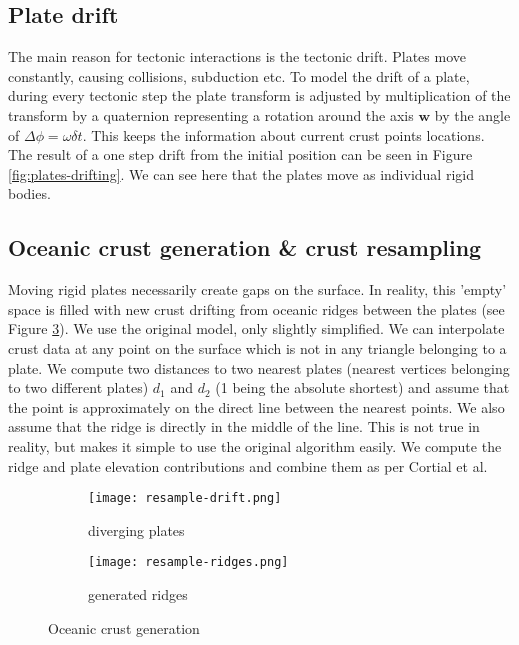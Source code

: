 \subsection{Plate drift}
The main reason for tectonic interactions is the tectonic drift. Plates move constantly, causing collisions, subduction etc. To model the drift of a plate, during every tectonic step the plate transform is adjusted
by multiplication of the transform by a quaternion representing a rotation around the axis $\mathbf{w}$ by the angle of $\Delta\phi=\omega\delta t$. This keeps the information about current crust points locations. The result of a one step drift from the initial position can be seen in Figure \ref{fig:plates-drifting}. We can see here that the plates move as individual rigid bodies.
\subsection{Oceanic crust generation \& crust resampling}
Moving rigid plates necessarily create gaps on the surface. In reality, this 'empty' space is filled with new crust drifting from oceanic ridges between the plates (see Figure \ref{fig:resample-mesh}). We use the original model, only slightly simplified. We can interpolate crust data at any point on the surface which is not in any triangle belonging to a plate. We compute two distances to two nearest plates (nearest vertices belonging to two different plates) $d_1$ and $d_2$ (1 being the absolute shortest) and assume that the point is approximately on the direct line between the nearest points. We also assume that the ridge is directly in the middle of the line. This is not true in reality, but makes it simple to use the original algorithm easily. We compute the ridge and plate elevation contributions and combine them as per Cortial et al.
\begin{figure}[ht]
\centering
\begin{subfigure}{7cm}
\texttt{[image: resample-drift.png]}
\caption{diverging plates}
\label{fig:resample-drift}
\end{subfigure}
\hspace*{1cm}
\begin{subfigure}{7cm}
\texttt{[image: resample-ridges.png]}
\caption{generated ridges}
\label{fig:resample-ridges}
\end{subfigure}
\caption{Oceanic crust generation}
\label{fig:resample-mesh}
\end{figure}

